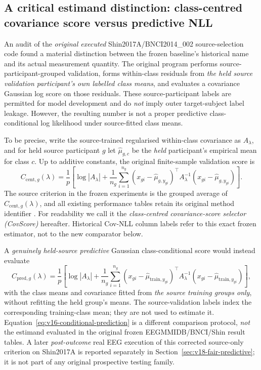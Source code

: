 \subsection{A critical estimand distinction: class-centred covariance score versus predictive NLL}
\label{sec:v16-estimand-audit}

An audit of the \emph{original executed} Shin2017A/BNCI2014\_002
source-selection code found a material distinction between the
frozen baseline's historical name and its actual measurement
quantity. The original program performs source-participant-grouped
validation, forms within-class residuals from \emph{the held source
validation participant's own labelled class means}, and evaluates
a covariance Gaussian log score on those residuals.
These source-participant labels are permitted for model development
and do \emph{not} imply outer target-subject label leakage.
However, the resulting number is not a proper predictive
class-conditional log likelihood under source-fitted class means.

To be precise, write the source-trained regularised within-class
covariance as $A_\lambda$, and for held source participant $g$
let $\widehat\mu_{g,c}$ be the \emph{held} participant's
empirical mean for class $c$. Up to additive constants, the
original finite-sample validation score is
\begin{equation}
\label{eq:v16-centred-score}
 C_{\mathrm{cent},g}(\lambda)=\frac{1}{p}
 \left[
  \log|A_\lambda|+
  \frac{1}{n_g}\sum_{i=1}^{n_g}
  (x_{gi}-\widehat\mu_{g,y_{gi}})^\top
  A_\lambda^{-1}(x_{gi}-\widehat\mu_{g,y_{gi}})
 \right].
\end{equation}
The source criterion in the frozen experiments is the
grouped average of $C_{\mathrm{cent},g}(\lambda)$,
and all existing performance tables retain its original
method identifier .
For readability we call it the
\emph{class-centred covariance-score selector (CovScore)}
hereafter. Historical Cov-NLL column labels refer
to this exact frozen estimator, not to the new comparator below.

A \emph{genuinely held-source predictive} Gaussian
class-conditional score would instead evaluate
\begin{equation}
\label{eq:v16-conditional-prediction}
 C_{\mathrm{pred},g}(\lambda)=\frac{1}{p}
 \left[
  \log|A_\lambda|+
  \frac{1}{n_g}\sum_{i=1}^{n_g}
  (x_{gi}-\widehat\mu_{\mathrm{train},y_{gi}})^\top
  A_\lambda^{-1}(x_{gi}-\widehat\mu_{\mathrm{train},y_{gi}})
 \right],
\end{equation}
with the class means and covariance fitted from
\emph{the source training groups only}, without refitting
the held group's means. The source-validation labels
index the corresponding training-class mean; they are
not used to estimate it. Equation~\eqref{eq:v16-conditional-prediction}
is a different comparison protocol, \emph{not}
the estimand evaluated in the original frozen
EEGMMIDB/BNCI/Shin result tables. A later \emph{post-outcome}
real EEG execution of this corrected source-only criterion
on Shin2017A is reported separately in
Section~\ref{sec:v18-fair-predictive}; it is not
part of any original prospective testing family.

